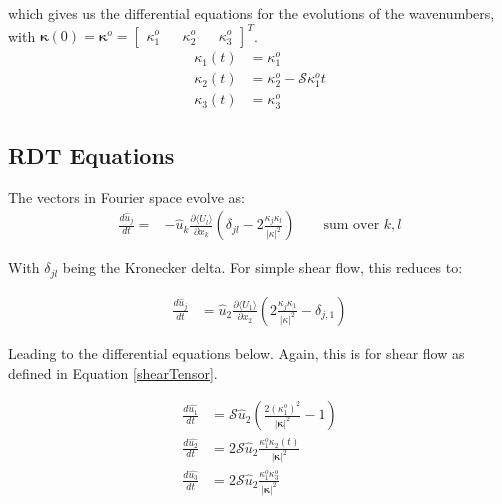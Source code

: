 \documentclass[paper=a4, fontsize=11pt]{scrartcl} %
\numberwithin{equation}{section} %
\numberwithin{figure}{section} %
\numberwithin{table}{section} %
\begin{document}
which gives us the differential equations for the evolutions of the wavenumbers,
with $\bm{\kappa}(0) = \bm{\kappa}^o = \begin{bmatrix} \kappa_1^o && \kappa_2^o && \kappa_3^o \end{bmatrix}^T$.
\begin{align}
    \kappa_1(t) &= \kappa_1^o  \\
    \kappa_2(t) &= \kappa_2^o - \mathcal{S} \kappa_1^o t \\
    \kappa_3(t) &= \kappa_3^o
\end{align}

\subsection{RDT Equations}

The vectors in Fourier space evolve as:
\begin{align}
    \frac{d \hat{u}_j}{dt} = & -\hat{u}_k \frac{\partial \langle U_l \rangle}{ \partial x_k} \left ( \delta_{jl} 
       - 2 \frac{ \kappa_j \kappa_l }{|\kappa|^2} \right )  \qquad \text{sum over } k,l 
\end{align}

With $\delta_{jl}$ being the Kronecker delta. For simple shear flow, this reduces to:

\begin{align}
    \frac{d \hat{u}_j}{dt} &= \hat{u}_2 \frac{\partial \langle U_1 \rangle}{ \partial x_2} 
        \left ( 2 \frac{\kappa_j \kappa_1 }{|\kappa|^2} - \delta_{j,1}  \right )
\end{align}

Leading to the differential equations below. Again, this is for shear flow as defined in Equation \ref{shearTensor}.

\begin{align}
    \frac{d \hat{u_1}}{dt} &= \mathcal{S} \hat{u}_2
        \left (
            \frac{2 \left( \kappa_1^o \right )^2}{  | \bm{\kappa} |^2  } - 1 
        \right ) \\
    \frac{d \hat{u_2}}{dt} &= 2 \mathcal{S} \hat{u} _2
             \frac{ \kappa_1^o \kappa_2(t) }{  | \bm{\kappa} |^2  } 
        \\
    \frac{d \hat{u_3}}{dt} &= 2 \mathcal{S} \hat{u}_2 
             \frac{ \kappa_1^o \kappa_3^o }{  | \bm{\kappa} |^2  } 
\end{align}



\end{document}
